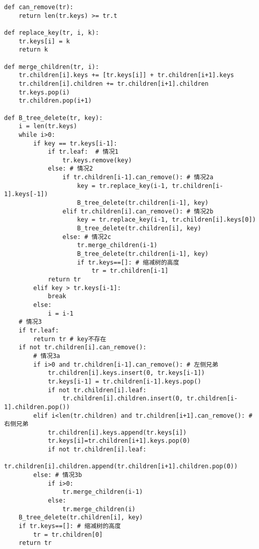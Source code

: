 \documentclass{ctexart}
\begin{document}
\lstset{language=Python}
\begin{lstlisting}
def can_remove(tr):
    return len(tr.keys) >= tr.t

def replace_key(tr, i, k):
    tr.keys[i] = k
    return k

def merge_children(tr, i):
    tr.children[i].keys += [tr.keys[i]] + tr.children[i+1].keys
    tr.children[i].children += tr.children[i+1].children
    tr.keys.pop(i)
    tr.children.pop(i+1)

def B_tree_delete(tr, key):
    i = len(tr.keys)
    while i>0:
        if key == tr.keys[i-1]:
            if tr.leaf:  # 情况1
                tr.keys.remove(key)
            else: # 情况2
                if tr.children[i-1].can_remove(): # 情况2a
                    key = tr.replace_key(i-1, tr.children[i-1].keys[-1])
                    B_tree_delete(tr.children[i-1], key)
                elif tr.children[i].can_remove(): # 情况2b
                    key = tr.replace_key(i-1, tr.children[i].keys[0])
                    B_tree_delete(tr.children[i], key)
                else: # 情况2c
                    tr.merge_children(i-1)
                    B_tree_delete(tr.children[i-1], key)
                    if tr.keys==[]: # 缩减树的高度
                        tr = tr.children[i-1]
            return tr
        elif key > tr.keys[i-1]:
            break
        else:
            i = i-1
    # 情况3
    if tr.leaf:
        return tr # key不存在
    if not tr.children[i].can_remove():
        # 情况3a
        if i>0 and tr.children[i-1].can_remove(): # 左侧兄弟
            tr.children[i].keys.insert(0, tr.keys[i-1])
            tr.keys[i-1] = tr.children[i-1].keys.pop()
            if not tr.children[i].leaf:
                tr.children[i].children.insert(0, tr.children[i-1].children.pop())
        elif i<len(tr.children) and tr.children[i+1].can_remove(): # 右侧兄弟
            tr.children[i].keys.append(tr.keys[i])
            tr.keys[i]=tr.children[i+1].keys.pop(0)
            if not tr.children[i].leaf:
                tr.children[i].children.append(tr.children[i+1].children.pop(0))
        else: # 情况3b
            if i>0:
                tr.merge_children(i-1)
            else:
                tr.merge_children(i)
    B_tree_delete(tr.children[i], key)
    if tr.keys==[]: # 缩减树的高度
        tr = tr.children[0]
    return tr
\end{lstlisting}

\end{document}
